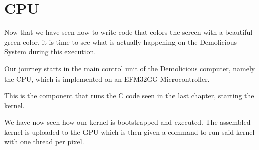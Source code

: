 \documentclass[../main/report.tex]{subfiles}
\begin{document}
\chapter{CPU}

Now that we have seen how to write code that colors the screen with a beautiful green color, 
it is time to see what is actually happening on the Demolicious System during this execution. 

Our journey starts in the main control unit of the Demolicious computer, namely the CPU, which is implemented on an EFM32GG Microcontroller.

This is the component that runs the C code seen in the last chapter, starting the kernel.











We have now seen how our kernel is bootstrapped and executed. 
The assembled kernel is uploaded to the GPU which is then given a command to run said kernel with one thread per pixel.
\end{document}
